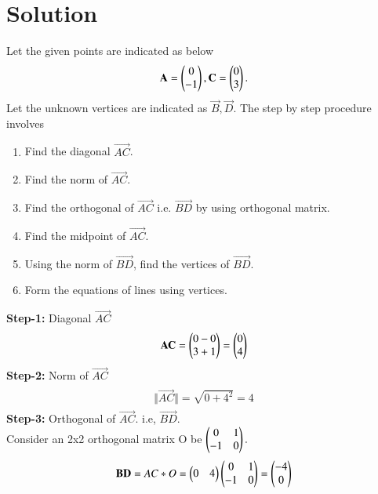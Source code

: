 \documentclass[journal,12pt,twocolumn]{IEEEtran}
\begin{document}
\section{Solution}
Let the given points are indicated as below\\
\begin{align}
\begin{split}
\mathbf{A} = \begin{pmatrix}0 \\ -1\end{pmatrix}, 
\mathbf{C} = \begin{pmatrix}0 \\ 3\end{pmatrix}.\\
\end{split}
\end{align}
Let the unknown vertices are indicated as $ \vec{B},\vec{D}$. The step by step procedure involves
\begin{enumerate}
    \item Find the diagonal $\vec{AC}$.
    \item Find the norm of $\vec{AC}$.
    \item Find the orthogonal of $\vec{AC}$ i.e. $\vec{BD}$ by using orthogonal matrix.
    \item Find the midpoint of $\vec{AC}$.
    \item Using the norm of $\vec{BD}$, find the vertices of $\vec{BD}$.
    \item Form the equations of lines using vertices.
\end{enumerate}
\textbf{Step-1:} Diagonal $\vec{AC}$
\begin{align}
\begin{split}
\mathbf{AC} = \begin{pmatrix}0-0\\3+1\end{pmatrix} = \begin{pmatrix}0\\4\end{pmatrix}
\end{split}
\end{align}
\textbf{Step-2:} Norm of $\vec{AC}$
\begin{align}
\begin{split}
\Vert\vec{AC}\Vert = \sqrt{0+4^2} = 4
\end{split}
\end{align}
\textbf{Step-3:} Orthogonal of $\vec{AC}$. i.e, $\vec{BD}$.
\\
Consider an 2x2 orthogonal matrix O be $\begin{pmatrix}0&1\\-1&0\end{pmatrix}.$
\\
\begin{align}
\begin{split}
\mathbf{BD} =  AC * O =  \begin{pmatrix}0&4\end{pmatrix}  \begin{pmatrix}0&1\\-1&0\end{pmatrix} = \begin{pmatrix}-4\\0\end{pmatrix}
\end{split}
\end{align}
\end{document}
